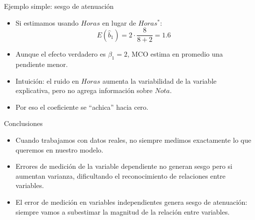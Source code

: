 \documentclass[10pt]{beamer}
\begin{document}
\begin{frame}{Ejemplo simple: sesgo de atenuaci\'on}
    \begin{itemize}
        \item Si estimamos usando $Horas$ en lugar de $Horas^{*}$:
        $$
        E\left(\hat{b}_{1}\right)
        =
        2\cdot
        \frac{8}{8+2}
        =
        1.6
        $$
        \item Aunque el efecto verdadero es $\beta_{1}=2$, MCO estima en promedio una pendiente menor.
        \item Intuici\'on: el ruido en $Horas$ aumenta la variabilidad de la variable explicativa, pero no agrega informaci\'on sobre $Nota$.
        \item Por eso el coeficiente se ``achica'' hacia cero.
    \end{itemize}
\end{frame}

\begin{frame}{Conclusiones}
    \begin{itemize}
        \item Cuando trabajamos con datos reales, no siempre medimos exactamente lo que queremos en nuestro modelo.
        \item Errores de medición de la variable dependiente no generan sesgo pero si aumentan varianza, dificultando el reconocimiento de relaciones entre variables.
        \item El error de medición en variables independientes genera sesgo de atenuación: siempre vamos a subestimar la magnitud de la relación entre variables.
    \end{itemize}
\end{frame}
\end{document}
